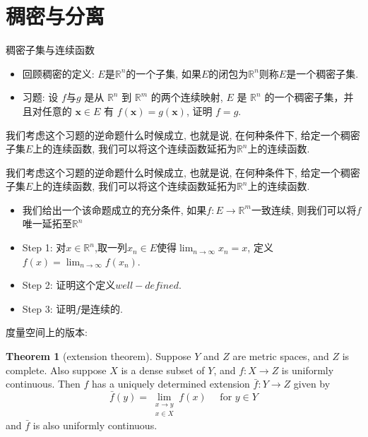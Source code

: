 \documentclass{beamer}
\theoremstyle{definition}
\newtheorem{theo}[defn]{Theorem}
\newcommand{\bb}[1]{\mathbb{#1}}
\begin{document}
\section{稠密与分离}
\begin{frame}{稠密子集与连续函数}
    \begin{itemize}
        \pause
        \item  回顾稠密的定义: $E$是$\bb{R}^n$的一个子集, 如果$E$的闭包为$\bb{R}^n$则称$E$是一个稠密子集.
              \pause
        \item  习题: 设 $f$与$g$ 是从 $\mathbb{R}^n$ 到 $\mathbb{R}^m$ 的两个连续映射, $E$ 是 $\mathbb{R}^n$ 的一个稠密子集，并且对任意的 $\boldsymbol{x} \in E$ 有 $f(\boldsymbol{x})=g(\boldsymbol{x})$, 证明 $f=g$.
    \end{itemize}
\end{frame}
\begin{frame}
    我们考虑这个习题的逆命题什么时候成立, 也就是说, 在何种条件下, 给定一个稠密子集$E$上的连续函数, 我们可以将这个连续函数延拓为$\bb{R}^n$上的连续函数.
\end{frame}
\begin{frame}
    我们考虑这个习题的逆命题什么时候成立, 也就是说, 在何种条件下, 给定一个稠密子集$E$上的连续函数, 我们可以将这个连续函数延拓为$\bb{R}^n$上的连续函数.
    \begin{itemize}
        \pause
        \item 我们给出一个该命题成立的充分条件, 如果$f:E\rightarrow \bb{R}^m$一致连续, 则我们可以将$f$唯一延拓至$\bb{R}^n$
              \pause
        \item   Step 1: 对$x\in \bb{R}^n$,取一列$x_n\in E$使得$\lim_{n\to \infty}x_n=x$, 定义$f(x)=\lim_{n\to \infty}f(x_n)$.
        \item   Step 2: 证明这个定义$well-defined$.
        \item   Step 3: 证明$f$是连续的.
    \end{itemize}
\end{frame}
\begin{frame}
    度量空间上的版本:
    \begin{theo}[extension theorem]
        Suppose $Y$ and $Z$ are metric spaces, and $Z$ is complete. Also suppose $X$ is a dense subset of $Y$, and $f: X \rightarrow Z$ is uniformly continuous. Then $f$ has a uniquely determined extension $\bar{f}: Y \rightarrow Z$ given by
        $$
            \bar{f}(y)=\lim _{\substack{x \rightarrow y \\ x \in X}} f(x) \quad \text { for } y \in Y
        $$
        and $\bar{f}$ is also uniformly continuous.
    \end{theo}
\end{frame}
\end{document}
